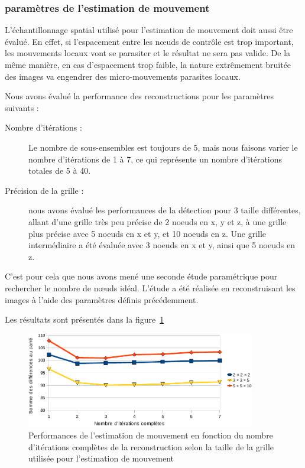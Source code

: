 \subsubsection{paramètres de l'estimation de mouvement}

L'échantillonnage spatial utilisé pour l'estimation de mouvement doit aussi être évalué. En effet, si l'espacement entre les nœuds de contrôle est trop important, les mouvements locaux vont se parasiter et le résultat ne sera pas valide. De la même manière, en cas d'espacement trop faible, la nature extrêmement bruitée des images va engendrer des micro-mouvements parasites locaux.

Nous avons évalué la performance des reconstructions pour les paramètres suivants :
\begin{description}
 \item[Nombre d'itérations :] Le nombre de sous-ensembles est toujours de 5, mais nous faisons varier le nombre d'itérations de 1 à 7, ce qui représente un nombre d'itérations totales de 5 à 40.
 \item[Précision de la grille :] nous avons évalué les performances de la détection pour 3 taille différentes, allant d'une grille très peu précise de 2 noeuds en x, y et z, à une grille plus précise avec 5 noeuds en x et y, et 10 noeuds en z. Une grille intermédiaire a été évaluée avec 3 noeuds en x et y, ainsi que 5 noeuds en z.
\end{description}


C'est pour cela que nous avons mené une seconde étude paramétrique pour rechercher le nombre de nœuds idéal. L'étude a été réalisée en reconstruisant les images à l'aide des paramètres définis précédemment.

Les résultats sont présentés dans la figure~\ref{fig:perfsFctIterTaille}

\begin{figure}
\centering
\includegraphics[width=10cm]{images/perfsRecalageFctIter-grid_crop}
\caption[Performances de l'estimation de mouvement en fonction de la taille de la grille de recherche]{Performances de l'estimation de mouvement en fonction du nombre d'itérations complètes de la reconstruction selon la taille de la grille utilisée pour l'estimation de mouvement}
\label{fig:perfsFctIterTaille}
\end{figure}

